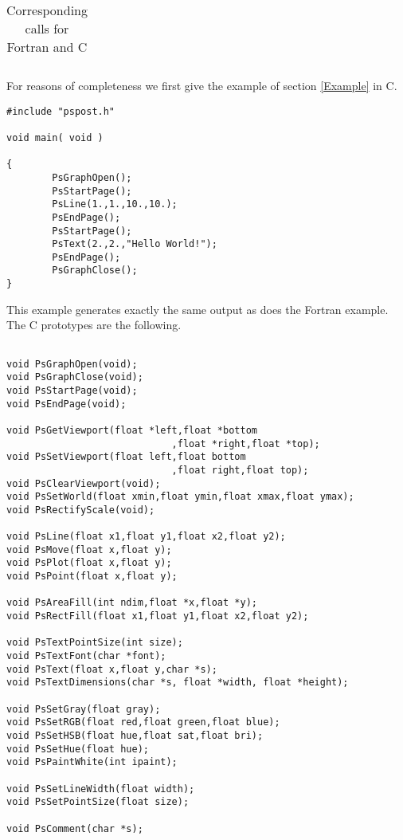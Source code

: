 \documentclass{article}
\begin{document}
\begin{table}
\begin{center}
\begin{tabular}{|l|l|}
\end{tabular}
\end{center}
\caption{Corresponding calls for Fortran and C}
\end{table}

\MakeShortVerb{\|}

For reasons of completeness we first give the example of section
\ref{Example} in C.

\begin{verbatim}
#include "pspost.h"

void main( void )

{
        PsGraphOpen();
        PsStartPage();
        PsLine(1.,1.,10.,10.);
        PsEndPage();
        PsStartPage();
        PsText(2.,2.,"Hello World!");
        PsEndPage();
        PsGraphClose();
}
\end{verbatim}

This example generates exactly the same output as does the
Fortran example.  The C prototypes are the following.

\begin{verbatim}

void PsGraphOpen(void);
void PsGraphClose(void);
void PsStartPage(void);
void PsEndPage(void);

void PsGetViewport(float *left,float *bottom
                             ,float *right,float *top);
void PsSetViewport(float left,float bottom
                             ,float right,float top);
void PsClearViewport(void);
void PsSetWorld(float xmin,float ymin,float xmax,float ymax);
void PsRectifyScale(void);

void PsLine(float x1,float y1,float x2,float y2);
void PsMove(float x,float y);
void PsPlot(float x,float y);
void PsPoint(float x,float y);

void PsAreaFill(int ndim,float *x,float *y);
void PsRectFill(float x1,float y1,float x2,float y2);

void PsTextPointSize(int size);
void PsTextFont(char *font);
void PsText(float x,float y,char *s);
void PsTextDimensions(char *s, float *width, float *height);

void PsSetGray(float gray);
void PsSetRGB(float red,float green,float blue);
void PsSetHSB(float hue,float sat,float bri);
void PsSetHue(float hue);
void PsPaintWhite(int ipaint);

void PsSetLineWidth(float width);
void PsSetPointSize(float size);

void PsComment(char *s);

\end{verbatim}

\DeleteShortVerb{\|}
\end{document}
